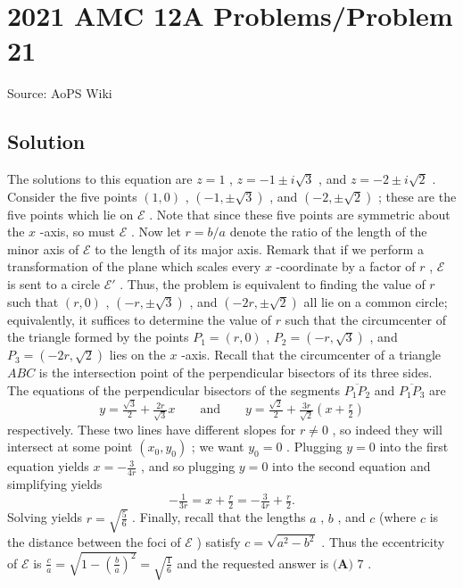 \documentclass[12pt]{article}
\begin{document}
\section*{{2021 AMC 12A Problems/Problem 21}}
Source: AoPS Wiki

\subsection*{Solution}
The solutions to this equation are $z = 1$ , $z = -1 \pm i\sqrt 3$ , and $z = -2\pm i\sqrt 2$ . Consider the five points $(1,0)$ , $\left(-1,\pm\sqrt 3\right)$ , and $\left(-2,\pm\sqrt 2\right)$ ; these are the five points which lie on $\mathcal E$ . Note that since these five points are symmetric about the $x$ -axis, so must $\mathcal E$ . Now let $r=b/a$ denote the ratio of the length of the minor axis of $\mathcal E$ to the length of its major axis. Remark that if we perform a transformation of the plane which scales every $x$ -coordinate by a factor of $r$ , $\mathcal E$ is sent to a circle $\mathcal E'$ . Thus, the problem is equivalent to finding the value of $r$ such that $(r,0)$ , $\left(-r,\pm\sqrt 3\right)$ , and $\left(-2r,\pm\sqrt 2\right)$ all lie on a common circle; equivalently, it suffices to determine the value of $r$ such that the circumcenter of the triangle formed by the points $P_1 = (r,0)$ , $P_2 = \left(-r,\sqrt 3\right)$ , and $P_3 = \left(-2r,\sqrt 2\right)$ lies on the $x$ -axis. Recall that the circumcenter of a triangle $ABC$ is the intersection point of the perpendicular bisectors of its three sides. The equations of the perpendicular bisectors of the segments $\overline{P_1P_2}$ and $\overline{P_1P_3}$ are \[y = \tfrac{\sqrt 3}2 + \tfrac{2r}{\sqrt 3}x\qquad\text{and}\qquad y = \tfrac{\sqrt 2}2 + \tfrac{3r}{\sqrt 2}\left(x + \tfrac r2\right)\] respectively. These two lines have different slopes for $r\neq 0$ , so indeed they will intersect at some point $(x_0,y_0)$ ; we want $y_0 = 0$ . Plugging $y = 0$ into the first equation yields $x = -\tfrac{3}{4r}$ , and so plugging $y=0$ into the second equation and simplifying yields \[-\tfrac{1}{3r} = x + \tfrac r2 = -\tfrac{3}{4r} + \tfrac{r}{2}.\] Solving yields $r=\sqrt{\tfrac 56}$ . Finally, recall that the lengths $a$ , $b$ , and $c$ (where $c$ is the distance between the foci of $\mathcal E$ ) satisfy $c = \sqrt{a^2 - b^2}$ . Thus the eccentricity of $\mathcal E$ is $\tfrac ca = \sqrt{1 - \left(\tfrac ba\right)^2} = \sqrt{\tfrac 16}$ and the requested answer is $\boxed{\textbf{(A) } 7}$ .
\end{document}
